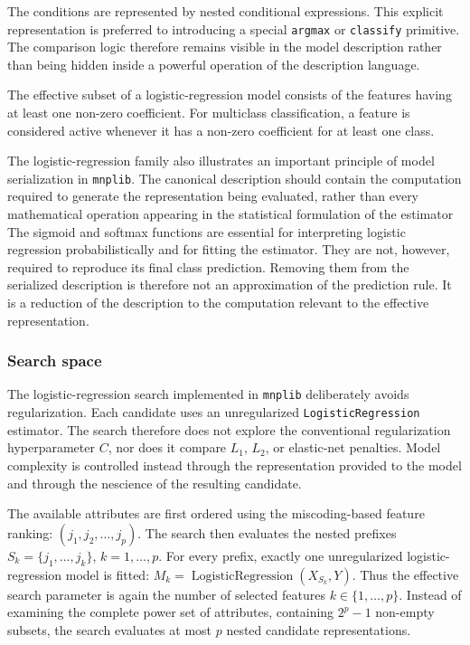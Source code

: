 The conditions are represented by nested conditional expressions. This explicit representation is preferred to introducing a special \texttt{argmax} or \texttt{classify} primitive. The comparison logic therefore remains visible in the model description rather than being hidden inside a powerful operation of the description language.

The effective subset of a logistic-regression model consists of the features having at least one non-zero coefficient. For multiclass classification, a feature is considered active whenever it has
a non-zero coefficient for at least one class.

The logistic-regression family also illustrates an important principle of model serialization in \texttt{mnplib}. The canonical description should contain the computation required to generate the representation being evaluated, rather than every mathematical operation appearing in the statistical formulation of the estimator The sigmoid and softmax functions are essential for interpreting logistic regression probabilistically and for fitting the estimator. They are not, however, required to reproduce its final class prediction. Removing them from the serialized description is therefore not an approximation of the prediction rule. It is a reduction of the description to the computation relevant to the effective representation.

\subsubsection{Search space}

The logistic-regression search implemented in \texttt{mnplib} deliberately avoids regularization. Each candidate uses an unregularized \texttt{LogisticRegression} estimator. The search therefore does not explore the conventional regularization hyperparameter $C$, nor does it compare $L_1$, $L_2$, or elastic-net penalties. Model complexity is controlled instead through the representation provided to the model and through the nescience of the resulting candidate.

The available attributes are first ordered using the miscoding-based feature ranking: $(j_1,j_2,\ldots,j_p)$. The search then evaluates the nested prefixes $S_k = \{j_1,\ldots,j_k\}$, $k=1,\ldots,p$.
For every prefix, exactly one unregularized logistic-regression model is fitted: $M_k = \operatorname{LogisticRegression}(X_{S_k},Y)$. Thus the effective search parameter is again the number of selected features $k \in \{1,\ldots,p\}$. Instead of examining the complete power set of attributes, containing $2^p-1$ non-empty subsets, the search evaluates at most \(p\) nested candidate representations.

